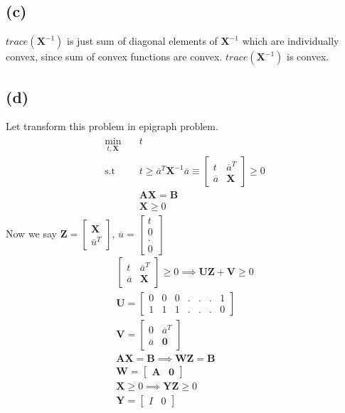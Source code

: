\documentclass{article}
\begin{document}
\subsection*{(c)}
$trace(\mathbf{X}^{-1})$ is just sum of diagonal elements of $\mathbf{X}^{-1}$ which are individually convex, since sum of convex functions are convex. $trace(\mathbf{X}^{-1})$ is convex.
\subsection*{(d)}
Let transform this problem in epigraph problem.
\begin{gather*}
	\begin{aligned}
		\min _{t, \mathbf{X}} \quad & t\\
		\textrm{s.t} \quad & t \ge \overline{a}^T\mathbf{X}^{-1}\overline{a} \equiv \begin{bmatrix}
		t & \overline{a}^T\\
		\overline{a} & \mathbf{X}
		\end{bmatrix} \ge 0\\
		& \mathbf{A}\mathbf{X} = \mathbf{B}\\
		& \mathbf{X} \ge 0
	\end{aligned}
\end{gather*}
Now we say $\mathbf{Z} = \begin{bmatrix} \mathbf{X}\\\overline{u}^T\end{bmatrix}$, $\overline{u} = \begin{bmatrix}
t\\
0\\
.\\
0
\end{bmatrix}$
\begin{gather*}
	\begin{bmatrix}
		t & \overline{a}^T\\
		\overline{a} & \mathbf{X}
		\end{bmatrix} \ge 0 \implies \mathbf{U}\mathbf{Z} + \mathbf{V} \ge 0\\
		\mathbf{U} = \begin{bmatrix}
		0 & 0 & 0 & . & . & . & 1\\
		1 & 1 & 1 & . & . & . & 0
		\end{bmatrix}\\
		\mathbf{V} = \begin{bmatrix}
		0 & \overline{a}^T\\
		\overline{a} & \mathbf{0}
		\end{bmatrix}\\
		\mathbf{A}\mathbf{X} = \mathbf{B} \implies \mathbf{W}\mathbf{Z} = \mathbf{B}\\
		\mathbf{W} = \begin{bmatrix}
		\mathbf{A} & \mathbf{0}
		\end{bmatrix}\\
		\mathbf{X} \ge 0 \implies \mathbf{Y}\mathbf{Z} \ge 0\\
		\mathbf{Y} = \begin{bmatrix}
		I & 0
		\end{bmatrix}
\end{gather*}
\end{document}
